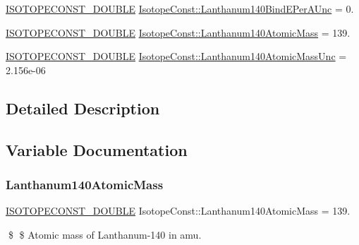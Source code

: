 \begin{DoxyCompactItemize}
\mbox{\hyperlink{group___isotope_const-_macros_ga8f45a7272ce02c0b4c65c44636ed719a}{I\+S\+O\+T\+O\+P\+E\+C\+O\+N\+S\+T\+\_\+\+D\+O\+U\+B\+LE}} \mbox{\hyperlink{group___isotope_const-_lanthanum-_la140_ga3a0ec4a0ef6d4f7254de6f81650871c2}{Isotope\+Const\+::\+Lanthanum140\+Bind\+E\+Per\+A\+Unc}} = 0.
\item 
\mbox{\hyperlink{group___isotope_const-_macros_ga8f45a7272ce02c0b4c65c44636ed719a}{I\+S\+O\+T\+O\+P\+E\+C\+O\+N\+S\+T\+\_\+\+D\+O\+U\+B\+LE}} \mbox{\hyperlink{group___isotope_const-_lanthanum-_la140_ga688438c3b4266e42a7c40840829f5b90}{Isotope\+Const\+::\+Lanthanum140\+Atomic\+Mass}} = 139.
\item 
\mbox{\hyperlink{group___isotope_const-_macros_ga8f45a7272ce02c0b4c65c44636ed719a}{I\+S\+O\+T\+O\+P\+E\+C\+O\+N\+S\+T\+\_\+\+D\+O\+U\+B\+LE}} \mbox{\hyperlink{group___isotope_const-_lanthanum-_la140_ga0a7a51a27411820ec54063b9118be2ee}{Isotope\+Const\+::\+Lanthanum140\+Atomic\+Mass\+Unc}} = 2.\+156e-\/06
\end{DoxyCompactItemize}


\subsection{Detailed Description}


\subsection{Variable Documentation}
\mbox{\label{group___isotope_const-_lanthanum-_la140_ga688438c3b4266e42a7c40840829f5b90}} 
\subsubsection{\texorpdfstring{Lanthanum140\+Atomic\+Mass}{Lanthanum140AtomicMass}}
{\footnotesize\ttfamily \mbox{\hyperlink{group___isotope_const-_macros_ga8f45a7272ce02c0b4c65c44636ed719a}{I\+S\+O\+T\+O\+P\+E\+C\+O\+N\+S\+T\+\_\+\+D\+O\+U\+B\+LE}} Isotope\+Const\+::\+Lanthanum140\+Atomic\+Mass = 139.}

\$ \$ Atomic mass of Lanthanum-\/140 in amu. \mbox{\label{group___isotope_const-_lanthanum-_la140_ga0a7a51a27411820ec54063b9118be2ee}} 
